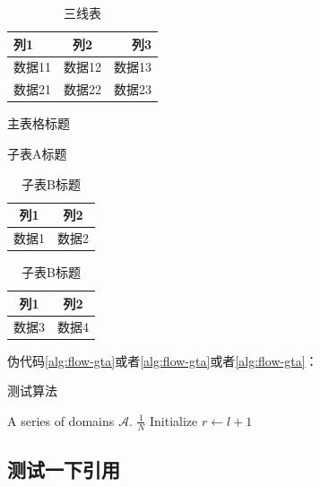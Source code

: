 \begin{table}[htbp]
    \centering
    \caption{三线表}
    \begin{tabularx}{0.8\linewidth}{LCR}
        \toprule
        列1   & 列2   & 列3   \\
        \midrule
        数据11 & 数据12 & 数据13 \\
        数据21 & 数据22 & 数据23 \\
        \bottomrule
    \end{tabularx}
    \label{tab:example2}
\end{table}

\begin{table}[htbp]
    \centering
    \caption{主表格标题}
    \begin{subtable}[t]{0.45\textwidth}
        \centering
        \caption{子表A标题}
        \label{tab:subtableA}
        \begin{tabular}{|c|c|}
            \hline
            列1 & 列2 \\ \hline
            数据1 & 数据2 \\ \hline
        \end{tabular}
    \end{subtable}
    \hfill
    \begin{subtable}[t]{0.45\textwidth}
        \centering
        \caption{子表B标题}
        \label{tab:subtableB}
        \begin{tabular}{|c|c|}
            \hline
            列1 & 列2 \\ \hline
            数据3 & 数据4 \\ \hline
        \end{tabular}
    \end{subtable}
\end{table}

伪代码\ref{alg:flow-gta}或者\cref{alg:flow-gta}或者\autoref{alg:flow-gta}：

\begin{algorithm}[htbp]
\caption{测试算法}
\label{alg:flow-gta}
\begin{algorithmic}[1]
\Input A series of domains $\mathcal{A}$.
\Output $\frac{1}{N}$ 
\STATE Initialize
    \STATE $r \gets l + 1$
\ENDFOR
\end{algorithmic}
\end{algorithm}

\subsection{测试一下引用}

